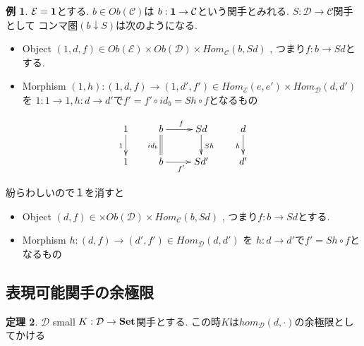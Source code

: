 \documentclass[dvipdfmx,a4paper,11pt]{report}
\theoremstyle{definition}
\newtheorem{thm}{定理}
\newtheorem{exa}[thm]{例}
\begin{document}
\begin{exa}
$\mathcal{E}={\bf 1}$とする.
$b \in Ob(\mathcal{C})$は
$b :  {\bf 1} \to \mathcal{C}$という関手とみれる. 
$S : \mathcal{D} \to \mathcal{C}$関手として
コンマ圏$(b \downarrow S)$は次のようになる. 
\begin{itemize}
\item Object $(1,d,f) \in Ob(\mathcal{E}) \times Ob(\mathcal{D}) \times Hom_{\mathcal{C}}(b, Sd)$ , つまり$f : b \to Sd$とする. 
\item Morphism $(1,h) : (1,d,f)  \to (1,d',f') \in Hom_{\mathcal{E}}(e,e') \times Hom_{\mathcal{D}}(d,d') $ を $1 : 1 \to 1, h: d \to d'$で$f' = f' \circ id_b = Sh \circ f$となるもの
\end{itemize}

\begin{equation*}
\xymatrix@C=25pt@R=20pt{
1 \ar@{->}[d] _{1}&b\ar@{=}[d]_{id_b}  \ar@{->}[r]^{f} & Sd\ar@{->}[d]^{Sh} &d\ar@{->}[d]_{h}\\
1&b\ar@{->}[r]_{f'} &Sd'&d' \\   
}
\end{equation*}

紛らわしいので１を消すと
\begin{itemize}
\item Object $(d,f) \in \times Ob(\mathcal{D}) \times Hom_{\mathcal{C}}(b, Sd)$ , つまり$f : b \to Sd$とする. 
\item Morphism $h : (d,f)  \to (d',f') \in Hom_{\mathcal{D}}(d,d') $ を 
$h: d \to d'$で$f'  = Sh \circ f$となるもの
\end{itemize}

\end{exa}



\subsection{表現可能関手の余極限}
 \begin{tcolorbox}
 [colback = white, colframe = green!35!black, fonttitle = \bfseries,breakable = true]
\begin{thm}
$\mathcal{D}$ small 
$K : \mathcal{D} \to {\bf Set}$関手とする.
この時$K$は$hom_{\mathcal{D}}(d,\cdot)$の余極限としてかける
\end{thm}
\end{tcolorbox}
\end{document}
